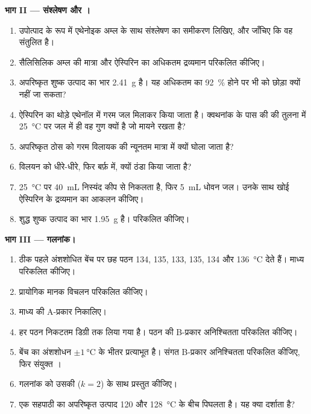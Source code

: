 \begin{problem}
\noindent\textbf{भाग II --- संश्लेषण और ।}
\begin{enumerate}[resume]
  \item उपोत्पाद के रूप में एथेनोइक अम्ल
         के साथ संश्लेषण का समीकरण लिखिए, और जाँचिए कि वह संतुलित है।
  \item सैलिसिलिक अम्ल की मात्रा और ऐस्पिरिन का अधिकतम द्रव्यमान
        परिकलित कीजिए।
  \item अपरिष्कृत शुष्क उत्पाद का भार \qty{2.41}{g} है। यह
        अधिकतम का \qty{92}{\percent} होने पर भी  को
        छोड़ा क्यों नहीं जा सकता?
  \item ऐस्पिरिन का  थोड़े एथेनॉल में गरम जल मिलाकर
        किया जाता है। क्वथनांक के पास की  की तुलना में \qty{25}{\celsius} पर जल में
         ही वह गुण क्यों है जो मायने रखता है?
  \item अपरिष्कृत ठोस को गरम विलायक की न्यूनतम मात्रा में क्यों घोला जाता है?
  \item विलयन को धीरे-धीरे, फिर बर्फ़ में, क्यों ठंडा किया जाता है?
  \item \qty{25}{\celsius} पर \qty{40}{mL} निस्यंद कीप से निकलता है,
        फिर \qty{5}{mL} धोवन जल। उनके साथ खोई ऐस्पिरिन के
        द्रव्यमान का आकलन कीजिए।
  \item शुद्ध शुष्क उत्पाद का भार \qty{1.95}{g} है।  परिकलित कीजिए।
\end{enumerate}

\noindent\textbf{भाग III --- गलनांक।}
\begin{enumerate}[resume]
  \item ठीक पहले अंशशोधित बेंच पर छह पठन 134, 135,
        133, 135, 134 और \qty{136}{\celsius} देते हैं। माध्य परिकलित कीजिए।
  \item प्रायोगिक मानक विचलन परिकलित कीजिए।
  \item माध्य की A-प्रकार  निकालिए।
  \item हर पठन निकटतम डिग्री तक लिया गया है। पठन की B-प्रकार
        अनिश्चितता परिकलित कीजिए।
  \item बेंच का अंशशोधन $\pm\qty{1}{\celsius}$ के भीतर
        प्रत्याभूत है। संगत B-प्रकार
        अनिश्चितता परिकलित कीजिए, फिर संयुक्त ।
  \item गलनांक को उसकी  ($k = 2$) के साथ प्रस्तुत कीजिए।
  \item एक सहपाठी का अपरिष्कृत उत्पाद 120 और
        \qty{128}{\celsius} के बीच पिघलता है। यह क्या दर्शाता है?
\end{enumerate}


\end{problem}
